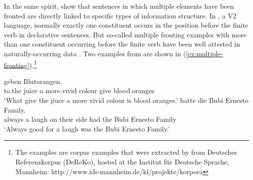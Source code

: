 \documentclass[output=paper
 	        ,biblatex
                ,babelshorthands
                ,newtxmath
                ,draftmode
                ,colorlinks, citecolor=brown
]{langscibook}
\begin{document}
In the same spirit, \cite{BC2010a} show that sentences in which
multiple elements have been fronted  are directly linked to specific
types of information structure. In , a V2 language, normally
exactly one constituent occurs in the position before the finite verb
in declarative sentences. But so-called multiple fronting examples
with more than one constituent occurring before the finite verb have
been well attested in naturally-occurring data \citep{Mueller2003b}. Two examples from
\cite{BC2010a} are shown in (\ref{ex:multiple-fronting}).\footnote{The examples are corpus examples that were extracted by \cite{BC2010a} from Deutsches Referenzkorpus (DeReKo), hosted at the Institut für Deutsche Sprache, Mannheim: http://www.ids-mannheim.de/kl/projekte/korpora}
\begin{exe}
  \ex\label{ex:multiple-fronting}
  \begin{xlist}
    \ex{} geben Blutorangen.\\
             to.the juice a more.vivid colour give blood.oranges\\
      \trans `What give the jiuce a more vivid colour is blood oranges.'
    \ex{} hatte die Bubi Ernesto Family.\\
            always a laugh on their side had the Bubi Ernesto Family\\
        \trans `Always good for a laugh was the Bubi Ernesto Family.'
  \end{xlist}

\end{exe}
\end{document}

